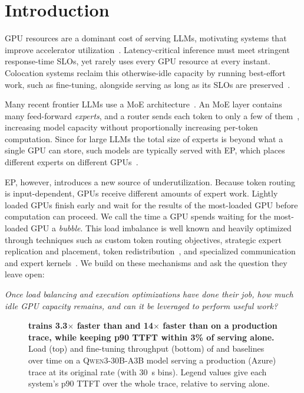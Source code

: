 \section{Introduction}
\label{sec:intro}

\acresetall

GPU resources are a dominant cost of serving \acp{LLM}, motivating systems that improve accelerator utilization~\cite{orca,vllm,sarathi,distserve,splitwise,muxserve,aegaeon}. Latency-critical inference must meet stringent response-time \acp{SLO}, yet rarely uses every GPU resource at every instant.
Colocation systems reclaim this otherwise-idle capacity by running best-effort work, such as fine-tuning, alongside serving as long as its \acp{SLO} are preserved~\cite{orion,llmstation,harli}.

Many recent frontier \acp{LLM} use a \ac{MoE} architecture~\cite{deepseekv3,deepseekv4,qwen3,kimik2,gptoss,gemini15,gemini25}. An \ac{MoE} layer contains many feed-forward \emph{experts}, and a router sends each token to only a few of them~\cite{switch}, increasing model capacity without proportionally increasing per-token computation.
Since for large \acp{LLM} the total size of experts is beyond what a single GPU can store, such models are typically served with \ac{EP}, which places different experts on different GPUs~\cite{deepseekv3,vllm-ep-rfc}.

\ac{EP}, however, introduces a new source of underutilization.
Because token routing is input-dependent, GPUs receive different amounts of expert work.
Lightly loaded GPUs finish early and wait for the results of the most-loaded GPU before computation can proceed.
We call the time a GPU spends waiting for the most-loaded GPU a \emph{bubble}.
This load imbalance is well known and heavily optimized through techniques such as custom token routing objectives, strategic expert replication and placement, token redistribution~\cite{switch,gshard,expertchoice,deepseekv3,fastermoe,eplb,lplb,waterfill,harmoeny}, and specialized communication and expert kernels~\cite{deepep,pplxkernels,megablocks}.
We build on these mechanisms and ask the question they leave open:
\begin{highlight}
  \emph{Once load balancing and execution optimizations have done
  their job, how much idle GPU capacity remains, and can it be leveraged to perform useful work?}
\end{highlight}

\begin{figure}[t]
  \centering
  \caption{\textbf{\sys trains 3.3$\times$ faster than \llmstation and 14$\times$ faster than \uncoord on a production trace, while keeping p90 \ac{TTFT} within 3\% of serving alone.}
  Load (top) and fine-tuning throughput (bottom) of \sys and baselines over time on a \textsc{Qwen3-30B-A3B} model serving a production (Azure) trace at its original rate (with \SI{30}{\second} bins).
  Legend values give each system’s p90 \ac{TTFT} over the whole trace, relative to serving alone.}
  \label{fig:intro-trace}

\end{figure}

